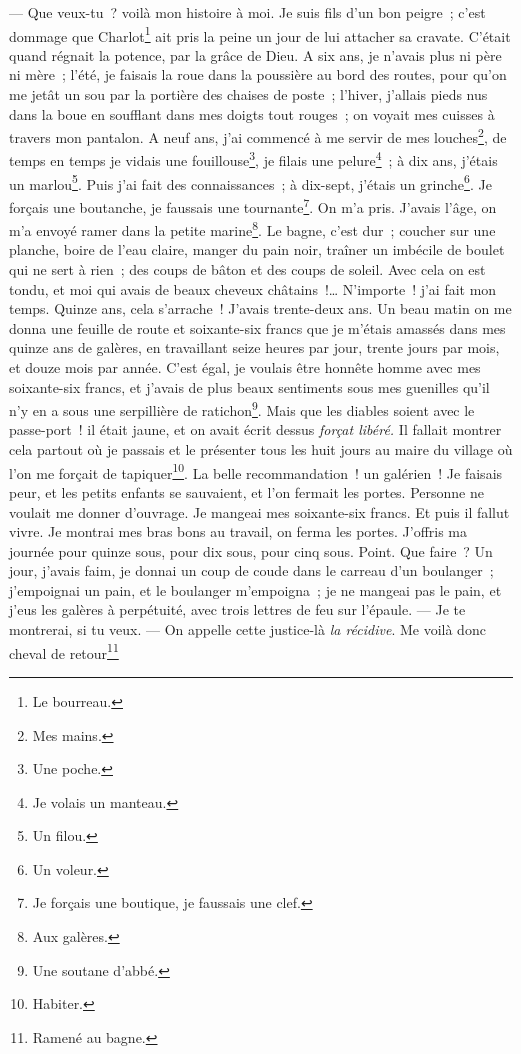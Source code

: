 \documentclass[french,twoside]{book} %
\begin{document}
— Que veux-tu ? voilà mon histoire à moi. Je suis fils d’un bon peigre ; c’est dommage que Charlot\footnote{ \noindent Le bourreau.
 } ait pris la peine un jour de lui attacher sa cravate. C’était quand régnait la potence, par la grâce de Dieu. A six ans, je n’avais plus ni père ni mère ; l’été, je faisais la roue dans la poussière au bord des routes, pour qu’on me jetât un sou par la portière des chaises de poste ; l’hiver, j’allais pieds nus dans la boue en soufflant dans mes doigts tout rouges ; on voyait mes cuisses à travers mon pantalon. A neuf ans, j’ai commencé à me servir de mes louches\footnote{ \noindent Mes mains.
 }, de temps en temps je vidais une fouillouse\footnote{ \noindent Une poche.
 }, je filais une pelure\footnote{ \noindent Je volais un manteau.
 } ; à dix ans, j’étais un marlou\footnote{ \noindent Un filou.
 }. Puis j’ai fait des connaissances ; à dix-sept, j’étais un grinche\footnote{ \noindent Un voleur.
 }. Je forçais une boutanche, je faussais une tournante\footnote{ \noindent Je forçais une boutique, je faussais une clef.
 }. On m’a pris. J’avais l’âge, on m’a envoyé ramer dans la petite marine\footnote{ \noindent Aux galères.
 }. Le bagne, c’est dur ; coucher sur une planche, boire de l’eau claire, manger du pain noir, traîner un imbécile de boulet qui ne sert à rien ; des  coups de bâton et des coups de soleil. Avec cela on est tondu, et moi qui avais de beaux cheveux châtains !… N’importe ! j’ai fait mon temps. Quinze ans, cela s’arrache ! J’avais trente-deux ans. Un beau matin on me donna une feuille de route et soixante-six francs que je m’étais amassés dans mes quinze ans de galères, en travaillant seize heures par jour, trente jours par mois, et douze mois par année. C’est égal, je voulais être honnête homme avec mes soixante-six francs, et j’avais de plus beaux sentiments sous mes guenilles qu’il n’y en a sous une serpillière de ratichon\footnote{ \noindent Une soutane d’abbé.
 }. Mais que les diables soient avec le passe-port ! il était jaune, et on avait écrit dessus \emph{forçat libéré.} Il fallait montrer cela partout où je passais et le présenter tous les huit jours au maire du village où l’on me forçait de tapiquer\footnote{ \noindent Habiter.
 }. La belle recommandation ! un galérien ! Je faisais peur, et les petits enfants se sauvaient, et l’on fermait les portes. Personne ne voulait me donner d’ouvrage. Je mangeai mes soixante-six francs. Et puis il fallut vivre. Je montrai mes bras bons au travail, on ferma les portes. J’offris ma journée pour quinze sous, pour dix sous, pour cinq sous. Point. Que faire ? Un jour, j’avais faim, je donnai un coup de coude dans le carreau d’un boulanger ; j’empoignai un pain, et le boulanger m’empoigna ; je ne mangeai pas le pain, et j’eus les galères à perpétuité, avec trois lettres de feu sur l’épaule. — Je te montrerai, si tu veux. — On appelle cette justice-là \emph{la  récidive}. Me voilà donc cheval de retour\footnote{ \noindent Ramené au bagne.
}
\end{document}
